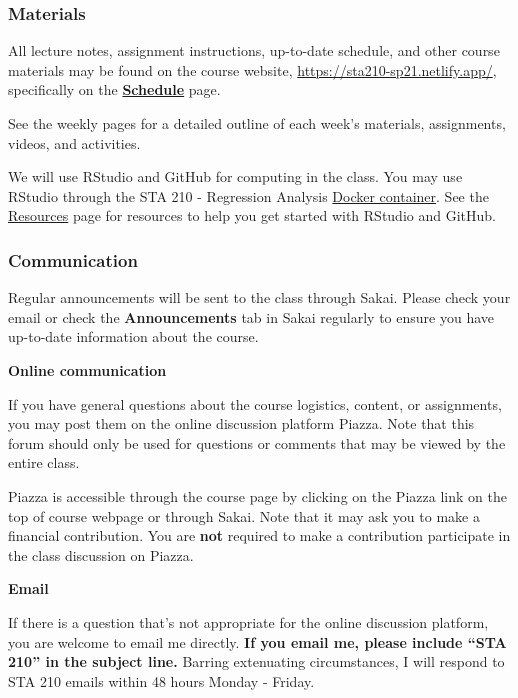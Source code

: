\documentclass[
]{article}
\begin{document}
\hypertarget{materials}{%
\subsubsection{Materials}\label{materials}}

All lecture notes, assignment instructions, up-to-date schedule, and
other course materials may be found on the course website,
\url{https://sta210-sp21.netlify.app/}, specifically on the
\href{https://sta210-sp21.netlify.app/schedule/}{\textbf{Schedule}}
page.

See the weekly pages for a detailed outline of each week's materials,
assignments, videos, and activities.

We will use RStudio and GitHub for computing in the class. You may use
RStudio through the STA 210 - Regression Analysis
\href{https://vm-manage.oit.duke.edu/containers}{Docker container}. See
the \href{/resources/}{Resources} page for resources to help you get
started with RStudio and GitHub.

\hypertarget{communication}{%
\subsubsection{Communication}\label{communication}}

Regular announcements will be sent to the class through Sakai. Please
check your email or check the \textbf{Announcements} tab in Sakai
regularly to ensure you have up-to-date information about the course.

\textbf{Online communication}

If you have general questions about the course logistics, content, or
assignments, you may post them on the online discussion platform Piazza.
Note that this forum should only be used for questions or comments that
may be viewed by the entire class.

Piazza is accessible through the course page by clicking on the Piazza
link on the top of course webpage or through Sakai. Note that it may ask
you to make a financial contribution. You are \textbf{not} required to
make a contribution participate in the class discussion on Piazza.

\textbf{Email}

If there is a question that's not appropriate for the online discussion
platform, you are welcome to email me directly. \textbf{If you email me,
please include ``STA 210'' in the subject line.} Barring extenuating
circumstances, I will respond to STA 210 emails within 48 hours Monday -
Friday.
\end{document}
